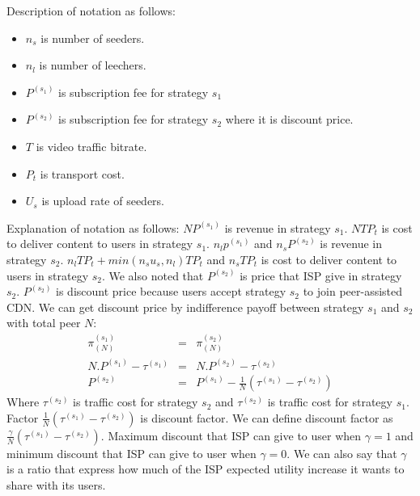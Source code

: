 \documentclass[paper]{ieice}
\begin{document}
Description of notation as follows:
\begin{itemize}
	\item $n_s$ is number of seeders.
	\item $n_l$ is number of leechers.
	\item $P^{(s_1)}$ is subscription fee for strategy $s_1$
	\item $P^{(s_2)}$ is subscription fee for strategy $s_2$ where it is discount price.
	\item $T$ is video traffic bitrate. 
	\item $P_t$ is transport cost. 
	\item $U_s$ is upload rate of seeders.
\end{itemize}
Explanation of notation as follows:
$N P^{(s_1)}$ is revenue in strategy $s_1$.  
$N T P_t$ is cost to deliver content to users in strategy $s_1$.
$n_l p^{(s_1)}$ and $n_s P^{(s_2)}$ is revenue in strategy $s_2$.
$n_l T P_t + min (n_s u_s,n_l)T P_t$ and $n_s T P_t$ is cost to deliver content to users in strategy $s_2$.
We also noted that $P^{(s_2)}$ is price that ISP give in strategy $s_2$. 
$P^{(s_2)}$ is discount price because users accept strategy $s_2$ to join peer-assisted CDN.  
We can get discount price by indifference payoff between strategy $s_1$ and $s_2$ with total peer $N$:
\begin{eqnarray}  
	\pi^{(s_1)}_{(N)} &=& \pi^{(s_2)}_{(N)}\\
	N.P^{(s_1)} - \tau^{(s_1)} &=& N.P^{(s_2)} - \tau^{(s_2)}\\
	P^{(s_2)} &=& P^{(s_1)} - \frac{1}{N} (\tau^{(s_1)} -  \tau^{(s_2)} ) 
\end{eqnarray}
Where $\tau^{(s_2)}$ is traffic cost for strategy $s_2$ and $\tau^{(s_2)}$ is traffic cost for strategy $s_1$.
Factor $\frac{1}{N} (\tau^{(s_1)} -  \tau^{(s_2)} )$ is discount factor.
We can define discount factor as $\frac{\gamma}{N} (\tau^{(s_1)} -  \tau^{(s_2)} )$.
Maximum discount that ISP can give to user when $\gamma=1$ and minimum discount that ISP can give to user when $\gamma=0$.
We can also say that $\gamma$ is a ratio that express how much of the ISP expected utility increase it wants to share with its users. 
\end{document}
